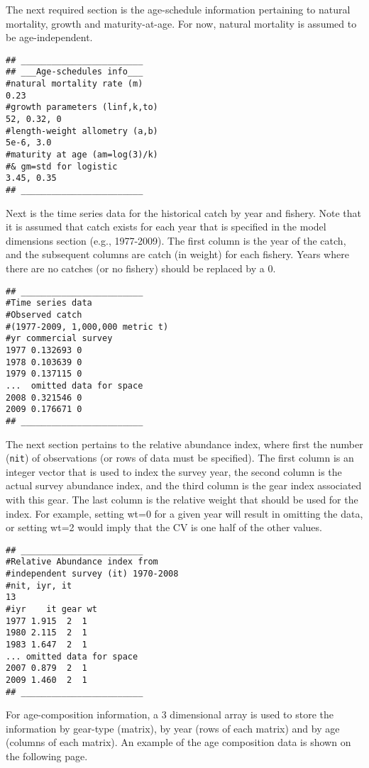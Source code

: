 \begin{multicols}{2}
The next required section is the age-schedule information pertaining to natural mortality, growth and maturity-at-age. For now, natural mortality is assumed to be age-independent.
\begin{verbatim}
## ________________________
## ___Age-schedules info___
#natural mortality rate (m)
0.23
#growth parameters (linf,k,to)
52, 0.32, 0
#length-weight allometry (a,b)
5e-6, 3.0
#maturity at age (am=log(3)/k) 
#& gm=std for logistic
3.45, 0.35
## ________________________
\end{verbatim}

Next is the time series data for the historical catch by year and fishery.  Note that it is assumed that catch exists for each year that is specified in the model dimensions section (e.g., 1977-2009).  The first column is the year of the catch, and the subsequent columns are catch (in weight) for each fishery.  Years where there are no catches (or no fishery) should be replaced by a 0.
\begin{verbatim}
## ________________________
#Time series data
#Observed catch 
#(1977-2009, 1,000,000 metric t)
#yr	commercial survey
1977 0.132693 0
1978 0.103639 0
1979 0.137115 0
...  omitted data for space
2008 0.321546 0
2009 0.176671 0
## ________________________
\end{verbatim}

The next section pertains to the relative abundance index, where first the number (\texttt{nit}) of observations (or rows of data must be specified).  The first column is an integer vector that is used to index the survey year, the second column is the actual survey abundance index, and the third column is the gear index associated with this gear.  The last column is the relative weight that should be used for the index.  For example, setting wt=0 for a given year will result in omitting the data, or setting wt=2 would imply that the CV is one half of the other values.
\begin{verbatim}
## ________________________
#Relative Abundance index from 
#independent survey (it) 1970-2008
#nit, iyr, it
13
#iyr    it gear wt
1977 1.915  2  1
1980 2.115  2  1
1983 1.647  2  1
... omitted data for space
2007 0.879  2  1
2009 1.460  2  1
## ________________________
\end{verbatim}

For age-composition information, a 3 dimensional array is used to store the information by gear-type (matrix), by year (rows of each matrix) and by age (columns of each matrix).  An example of the age composition data is shown on the following page.  


\end{multicols}
